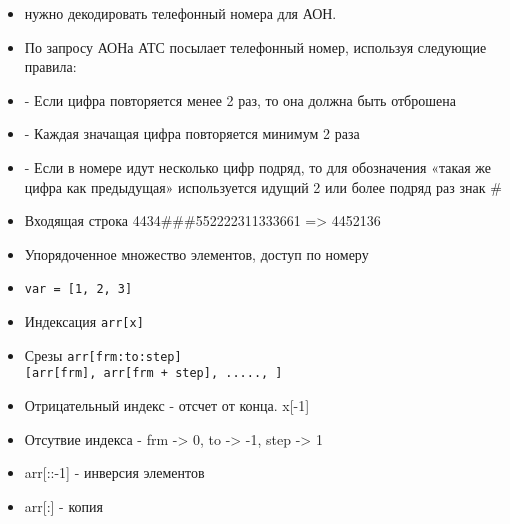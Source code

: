 \documentclass{article}
\begin{document}

\begin{itemize}
    \item нужно декодировать телефонный номера для АОН.
    \item По запросу АОНа АТС посылает телефонный номер, используя следующие правила:
    \item - Если цифра повторяется менее 2 раз, то она должна быть отброшена
    \item - Каждая значащая цифра повторяется минимум 2 раза
    \item - Если в номере идут несколько цифр подряд, то для обозначения «такая же цифра как
         предыдущая» используется идущий 2  или более подряд раз знак \#
    \item Входящая строка 4434\#\#\#552222311333661 => 4452136
\end{itemize}
\newpage

\begin{itemize}
    \item Упорядоченное множество элементов, доступ по номеру
    \item \lstinline!var = [1, 2, 3]!
    \item Индексация \lstinline!arr[x]!
    \item Срезы 
            \lstinline!arr[frm:to:step]! \\
            \lstinline![arr[frm], arr[frm + step], ....., ]!
    \item Отрицательный индекс - отсчет от конца. x[-1]
    \item Отсутвие индекса - frm -> 0, to -> -1, step -> 1
    \item arr[::-1] - инверсия элементов
    \item arr[:] - копия
\end{itemize}
\newpage
\end{document}
